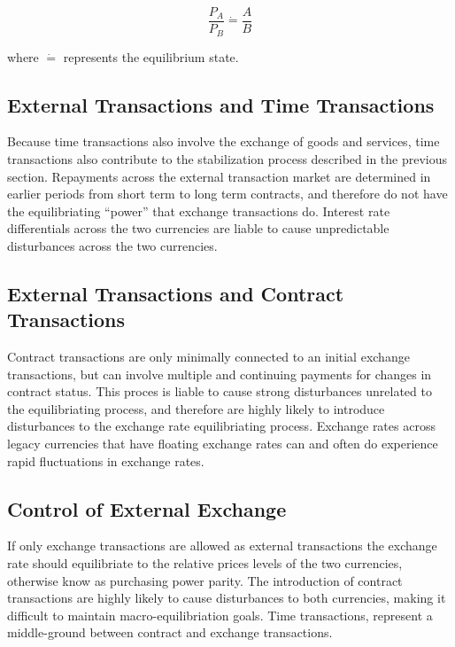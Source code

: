 \[
    \frac {P_A} {P_B} \dot{=} \frac A B
\]

where $\dot{=}$ represents the equilibrium state.

\subsection{External Transactions and Time Transactions}

Because time transactions also involve the exchange of goods and services, time transactions also
contribute to the stabilization process described in the previous section. Repayments across the
external transaction market are determined in earlier periods from short term to long term
contracts, and therefore do not have the equilibriating ``power'' that exchange transactions do.
Interest rate differentials across the two currencies are liable to cause unpredictable disturbances
across the two currencies.

\subsection{External Transactions and Contract Transactions}

Contract transactions are only minimally connected to an initial exchange transactions, but can
involve multiple and continuing payments for changes in contract status. This proces is liable to
cause strong disturbances unrelated to the equilibriating process, and therefore are highly likely
to introduce disturbances to the exchange rate equilibriating process. Exchange rates across legacy
currencies that have floating exchange rates can and often do experience rapid fluctuations in
exchange rates.

\subsection{Control of External Exchange}

If only exchange transactions are allowed as external transactions the exchange rate should
equilibriate to the relative prices levels of the two currencies, otherwise know as purchasing power
parity. The introduction of contract transactions are highly likely to cause disturbances to both
currencies, making it difficult to maintain macro-equilibriation goals. Time transactions, represent
a middle-ground between contract and exchange transactions. 
